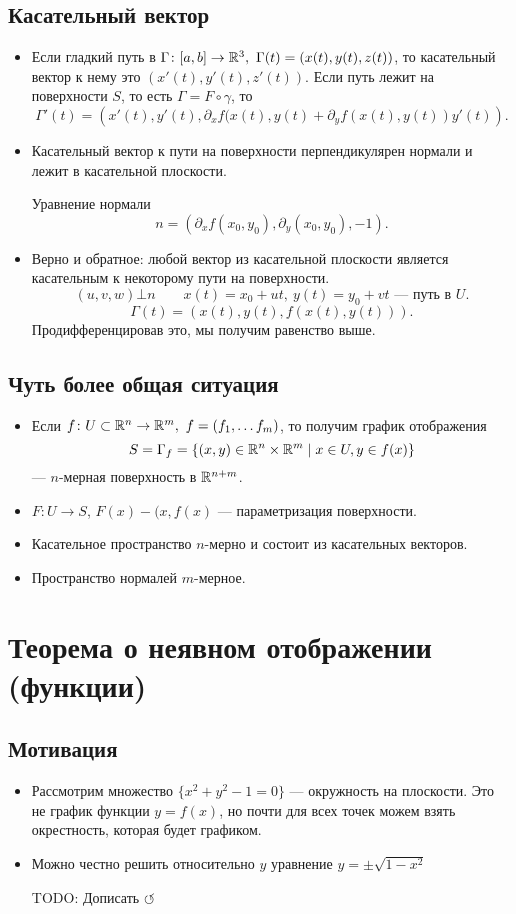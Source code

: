 \documentclass[11pt,dvipsnames]{report}
\begin{document}
\subsection{Касательный вектор}
\begin{itemize}
    \item  Если гладкий путь в $ \Gamma \colon [a,b] \to  \mathbb{R}^3, ~\Gamma (t) = \left( x(t), y(t), z(t) \right)  $, то касательный вектор к нему это $ \left( x'(t), y'(t),z'(t) \right) $.  Если путь лежит на поверхности $ S$, то есть $ \Gamma = F \circ \gamma $, то
	\[
	    \Gamma '(t) = \left( x'(t), y'(t), \partial _xf(x(t), y(t) + \partial _yf(x(t), y(t))y'(t) \right)
	.\]
    \item Касательный вектор к пути на поверхности перпендикулярен нормали и лежит в касательной плоскости.

	Уравнение нормали
	\[
	    n=\left( \partial _xf(x_0, y_0), \partial _y(x_0, y_0), -1 \right)
	.\]
    \item Верно и обратное:  любой вектор из касательной плоскости является касательным к некоторому пути на поверхности.
	\[
	    (u, v, w) \bot n \qquad x(t) = x_0+ ut, ~y(t) =y_0+vt \text{ --- путь в } U
	.\]
	\[
	    \Gamma (t) = (x(t), y(t), f(x(t), y(t)))
	.\]
	Продифференцировав это, мы получим равенство выше.
\end{itemize}
\subsection{Чуть более общая ситуация}
\begin{itemize}
    \item Если $ f\colon U \subset \mathbb{R}^{n} \to  \mathbb{R}^{m} , ~ f= (f_1, \ldots f_m)$, то получим график отображения
	\[
	    S = \Gamma _f = \{(x, y) \in \mathbb{R}^{n} \times \mathbb{R}^{m} \mid x \in U, y \in f(x)\}
	\]
	--- $ n$-мерная поверхность в  $ \mathbb{R}^{n+m}$.
    \item $ F\colon U \to  S$, $ F(x) - (x, f(x)$ --- параметризация поверхности.
    \item Касательное пространство $ n$-мерно и состоит из касательных векторов.
    \item Пространство нормалей  $ m$-мерное.
\end{itemize}
\section{Теорема о неявном отображении (функции)}
\subsection{Мотивация}
\begin{itemize}
    \item
	Рассмотрим множество $ \{x^2+y^2-1= 0\}$ --- окружность на плоскости. Это не график функции $ y = f(x)$, но почти для всех точек можем взять окрестность, которая будет графиком.
    \item  Можно честно решить относительно $ y$ уравнение  $ y = \pm \sqrt{1-x^2 } $

	TODO: Дописать $\circlearrowleft$
\end{itemize}
\end{document}
